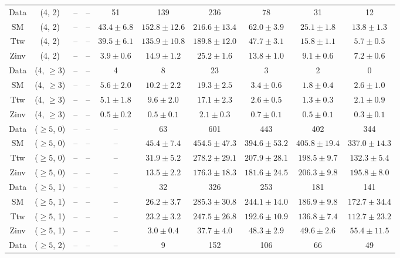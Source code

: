\begin{table}[h!]
{\begin{tabular}{cccccccccc}
	Data & (4, 2) & -- & -- & 51 & 139 & 236 & 78 & 31 & 12 \\[0.5ex] 
	SM & (4, 2) & -- & -- & $43.4\pm 6.8$ & $152.8\pm 12.6$ & $216.6\pm 13.4$ & $62.0\pm 3.9$ & $25.1\pm 1.8$ & $13.8\pm 1.3$ \\[0.5ex] 
	Ttw & (4, 2) & -- & -- & $39.5\pm 6.1$ & $135.9\pm 10.8$ & $189.8\pm 12.0$ & $47.7\pm 3.1$ & $15.8\pm 1.1$ & $5.7\pm 0.5$ \\[0.5ex] 
	Zinv & (4, 2) & -- & -- & $3.9\pm 0.6$ & $14.9\pm 1.2$ & $25.2\pm 1.6$ & $13.8\pm 1.0$ & $9.1\pm 0.6$ & $7.2\pm 0.6$ \\[0.5ex] 
	Data & (4, $\ge3$) & -- & -- & 4 & 8 & 23 & 3 & 2 & 0 \\[0.5ex] 
	SM & (4, $\ge3$) & -- & -- & $5.6\pm 2.0$ & $10.2\pm 2.2$ & $19.3\pm 2.5$ & $3.4\pm 0.6$ & $1.8\pm 0.4$ & $2.6\pm 1.0$ \\[0.5ex] 
	Ttw & (4, $\ge3$) & -- & -- & $5.1\pm 1.8$ & $9.6\pm 2.0$ & $17.1\pm 2.3$ & $2.6\pm 0.5$ & $1.3\pm 0.3$ & $2.1\pm 0.9$ \\[0.5ex] 
	Zinv & (4, $\ge3$) & -- & -- & $0.5\pm 0.2$ & $0.5\pm 0.1$ & $2.1\pm 0.3$ & $0.7\pm 0.1$ & $0.5\pm 0.1$ & $0.3\pm 0.1$ \\[0.5ex] 
	Data & ($\ge5$, 0) & -- & -- & -- & 63 & 601 & 443 & 402 & 344 \\[0.5ex] 
	SM & ($\ge5$, 0) & -- & -- & -- & $45.4\pm 7.4$ & $454.5\pm 47.3$ & $394.6\pm 53.2$ & $405.8\pm 19.4$ & $337.0\pm 14.3$ \\[0.5ex] 
	Ttw & ($\ge5$, 0) & -- & -- & -- & $31.9\pm 5.2$ & $278.2\pm 29.1$ & $207.9\pm 28.1$ & $198.5\pm 9.7$ & $132.3\pm 5.4$ \\[0.5ex] 
	Zinv & ($\ge5$, 0) & -- & -- & -- & $13.5\pm 2.2$ & $176.3\pm 18.3$ & $181.6\pm 24.5$ & $206.3\pm 9.8$ & $195.8\pm 8.0$ \\[0.5ex] 
	Data & ($\ge5$, 1) & -- & -- & -- & 32 & 326 & 253 & 181 & 141 \\[0.5ex] 
	SM & ($\ge5$, 1) & -- & -- & -- & $26.2\pm 3.7$ & $285.3\pm 30.8$ & $244.1\pm 14.0$ & $186.9\pm 9.8$ & $172.7\pm 34.4$ \\[0.5ex] 
	Ttw & ($\ge5$, 1) & -- & -- & -- & $23.2\pm 3.2$ & $247.5\pm 26.8$ & $192.6\pm 10.9$ & $136.8\pm 7.4$ & $112.7\pm 23.2$ \\[0.5ex] 
	Zinv & ($\ge5$, 1) & -- & -- & -- & $3.0\pm 0.4$ & $37.7\pm 4.0$ & $48.3\pm 2.9$ & $49.6\pm 2.6$ & $55.4\pm 11.5$ \\[0.5ex] 
	Data & ($\ge5$, 2) & -- & -- & -- & 9 & 152 & 106 & 66 & 49 \\[0.5ex] 

\end{tabular}}
\end{table}

